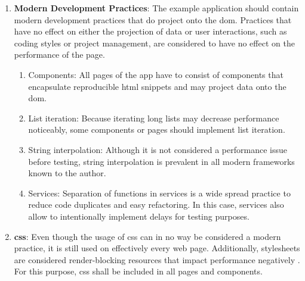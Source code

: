 \documentclass[a4paper, 12pt]{article}
\begin{document}
\begin{enumerate}
  \item \textbf{Modern Development Practices}: The example application should contain modern development practices that do project onto the \acrshort{dom}.
  Practices that have no effect on either the projection of data or user interactions, such as coding styles or project management, are considered to have no effect on the performance of the page.
  
  \begin{enumerate}
    \item Components: All pages of the app have to consist of components that encapsulate reproducible \acrshort{html} snippets and may project data onto the \acrshort{dom}.
    \item List iteration: Because iterating long lists may decrease performance noticeably, some components or pages should implement list iteration.
    \item String interpolation: Although it is not considered a performance issue before testing, string interpolation is prevalent in all modern frameworks known to the author.
    \item Services: \label{enum:services} Separation of functions in services is a wide spread practice to reduce code duplicates and easy refactoring.
    In this case, services also allow to intentionally implement delays for testing purposes.
  \end{enumerate}
  
  \item \textbf{\acrshort{css}}: Even though the usage of \acrshort{css} can in no way be considered a modern practice, it is still used on effectively every web page.
  Additionally, stylesheets are considered render-blocking resources that impact performance negatively \citep{renderblocking,eliminateRenderBlocking}.
  For this purpose, \acrshort{css} shall be included in all pages and components.
  

\end{enumerate}
\end{document}
